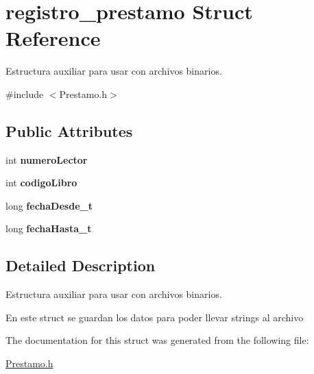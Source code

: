 \hypertarget{structregistro__prestamo}{}\section{registro\+\_\+prestamo Struct Reference}
\label{structregistro__prestamo}


Estructura auxiliar para usar con archivos binarios.  




{\ttfamily \#include $<$Prestamo.\+h$>$}

\subsection*{Public Attributes}
\begin{DoxyCompactItemize}
\item 
int {\bfseries numero\+Lector}\hypertarget{structregistro__prestamo_a1a1674a7fb97f8be9dbce8ef1cb0b48a}{}\label{structregistro__prestamo_a1a1674a7fb97f8be9dbce8ef1cb0b48a}

\item 
int {\bfseries codigo\+Libro}\hypertarget{structregistro__prestamo_a7cbdec0601ca0b61e2078cdba908a6b6}{}\label{structregistro__prestamo_a7cbdec0601ca0b61e2078cdba908a6b6}

\item 
long {\bfseries fecha\+Desde\+\_\+t}\hypertarget{structregistro__prestamo_a053595fbaa2ff810bf0ce18c7353295f}{}\label{structregistro__prestamo_a053595fbaa2ff810bf0ce18c7353295f}

\item 
long {\bfseries fecha\+Hasta\+\_\+t}\hypertarget{structregistro__prestamo_a05a0ae142fe7455eab7981ab8494c14d}{}\label{structregistro__prestamo_a05a0ae142fe7455eab7981ab8494c14d}

\end{DoxyCompactItemize}


\subsection{Detailed Description}
Estructura auxiliar para usar con archivos binarios. 

En este struct se guardan los datos para poder llevar strings al archivo 

The documentation for this struct was generated from the following file\+:\begin{DoxyCompactItemize}
\item 
\hyperlink{_prestamo_8h}{Prestamo.\+h}\end{DoxyCompactItemize}
